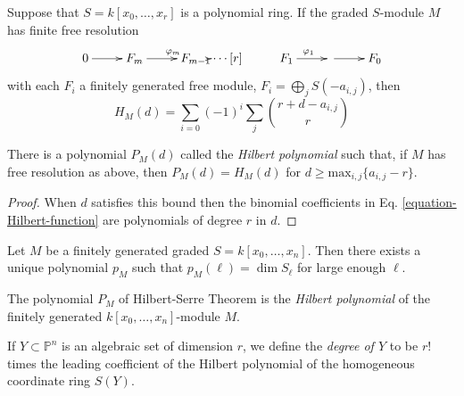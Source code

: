 \begin{lemma}
\label{lemma-Hilbert-function}
Suppose that $S=k[x_0,\ldots,x_r]$ is a polynomial ring. If the graded
$S$-module $M$ has finite free resolution
$$
\xymatrix{
0\ar[r]&F_m\ar[r]^{\varphi_m}&F_{m-1}\ar\cdots[r]&F_1\ar[r]^{\varphi_1}&
\ar[r]&F_0
}
$$
with each $F_i$ a finitely generated free module,
$F_i=\bigoplus_{j}S(-a_{i,j})$, then
\begin{equation}
\label{equation-Hilbert-function}
H_M(d)=\sum_{i=0}(-1)^i\sum_{j}\binom{r+d-a_{i,j}}{r}
\end{equation}
\end{lemma}

\begin{lemma}
\label{lemma-Hilbert-function-becomes-polynomial}
There is a polynomial $P_M(d)$ called the {\it Hilbert polynomial} such that, if
$M$ has free resolution as above, then $P_M(d)=H_M(d)$ for 
$d\geq\text{max}_{i,j}\{a_{i,j}-r\}$.
\end{lemma}

\begin{proof}
When $d$ satisfies this bound then the binomial coefficients in Eq.
\ref{equation-Hilbert-function} are polynomials of degree $r$ in $d$.
\end{proof}

\begin{theorem}
\label{theorem-Hilbert-Serre}
\begin{reference}
\cite[I, Theorem 7.5]{hart}
\end{reference}
Let $M$ be a finitely generated graded $S=k[x_0,\ldots,x_n]$. Then there exists
a unique polynomial $p_M$ such that $p_M(\ell)=\dim S_\ell$ for large enough
$\ell$.
\end{theorem}

\begin{definition}
\label{definition-Hilbert-polynomial}
\begin{reference}
\cite[I, p. 52]{har}
\end{reference}
The polynomial $P_M$ of Hilbert-Serre Theorem \cite{Hilbert-Serre} is the {\it
Hilbert polynomial} of the finitely generated $k[x_0,\ldots,x_n]$-module $M$.
\end{definition}

\begin{definition}
\label{definition-degree-of-projective-variety}
\begin{reference}
\cite[p. 52]{hart}
\end{reference}
If $Y\subset \mathbb{P}^n$ is an algebraic set of dimension $r$, we define the
{\it degree of $Y$} to be $r!$ times the leading coefficient of the Hilbert
polynomial of the homogeneous coordinate ring $S(Y)$.
\end{definition}

